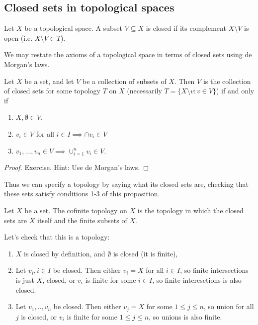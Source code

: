 \subsection{Closed sets in topological spaces}
\begin{definition}
  Let $X$ be a topological space. A subset $V\subseteq X$ is closed if its complement
  $X\setminus V$ is open (i.e. $X\setminus V\in T$).
  \label{<+label+>}
\end{definition}
We may restate the axioms of a topological space in terms of closed sets using
de Morgan's laws.
\begin{proposition}
  Let $X$ be a set, and let $V$ be a collection of subsets of $X$. Then $V$ is
  the collection of closed sets for some topology $T$ on $X$ (necessarily
  $T=\{X\setminus v: v\in V\}$) if and only if
  \begin{enumerate}
    \item $X,\emptyset \in V$,
    \item $v_i\in V$ for all $i\in I \implies \cap v_i\in V$
    \item $v_1,\dots, v_n\in V \implies \cup_{i=1}^n v_i\in V$.
  \end{enumerate}
  \label{<+label+>}
\end{proposition}
\begin{proof}
  Exercise. Hint: Use de Morgan's laws.
\end{proof}

Thus we can specify a topology by saying what its closed sets are, checking that these
sets satisfy conditions 1-3 of this proposition.

\begin{definition}
  Let $X$ be a set. The cofinite topology on $X$ is the topology in which the
  closed sets are $X$ itself and the finite subsets of $X$. 
  \label{<+label+>}
\end{definition}
 Let's check that this is a topology: 
 \begin{enumerate}
   \item $X$ is closed by definition, and $\emptyset$ is closed (it is finite),
   \item Let $v_i,i\in I$ be closed. Then either $v_i =X$ for all $i\in I$, so
     finite intersections is just $X$, closed, or $v_i$ is finite for some $i\in
     I$, so finite interesctions is also closed.
   \item Let $v_1,.., v_n$ be closed. Then either $v_j=X$ for some $1\leq j\leq
     n$, so union for all $j$ is closed, or $v_i$ is finite for some $1\leq
     j\leq n$, so unions is also finite.
 \end{enumerate}
